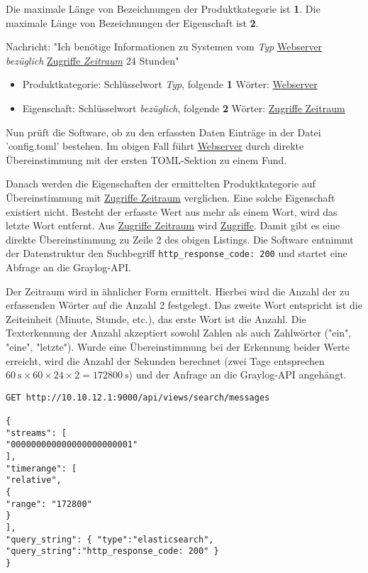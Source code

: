 Die maximale Länge von Bezeichnungen der Produktkategorie ist \textbf{1}. Die maximale Länge von Bezeichnungen der Eigenschaft ist \textbf{2}.

Nachricht: "Ich benötige Informationen zu Systemen vom \textit{Typ} \uline{Webserver} \textit{bezüglich} \uline{Zugriffe \textit{Zeitraum}} 24 Stunden"

\begin{itemize}
\item Produktkategorie: Schlüsselwort \textit{Typ}, folgende \textbf{1} Wörter: \uline{Webserver}
\item Eigenschaft: Schlüsselwort \textit{bezüglich}, folgende \textbf{2} Wörter: \uline{Zugriffe Zeitraum}
\end{itemize}

Nun prüft die Software, ob zu den erfassten Daten Einträge in der Datei 'config.toml' bestehen. Im obigen Fall führt \uline{Webserver} durch direkte Übereinstimmung mit der ersten TOML-Sektion zu einem Fund. 

Danach werden die Eigenschaften der ermittelten Produktkategorie auf Übereinstimmung mit \uline{Zugriffe Zeitraum} verglichen. Eine solche Eigenschaft existiert nicht. Besteht der erfasste Wert aus mehr als einem Wort, wird das letzte Wort entfernt. Aus \uline{Zugriffe Zeitraum} wird \uline{Zugriffe}. Damit gibt es eine direkte Übereinstimmung zu Zeile 2 des obigen Listings. Die Software entnimmt der Datenstruktur den Suchbegriff \lstinline{http_response_code: 200} und startet eine Abfrage an die Graylog-API.

Der Zeitraum wird in ähnlicher Form ermittelt. Hierbei wird die Anzahl der zu erfassenden Wörter auf die Anzahl 2 festgelegt. Das zweite Wort entspricht ist die Zeiteinheit (Minute, Stunde, etc.), das erste Wort ist die Anzahl. Die Texterkennung der Anzahl akzeptiert sowohl Zahlen als auch Zahlwörter ("ein", "eine", "letzte"). Wurde eine Übereinstimmung bei der Erkennung beider Werte erreicht, wird die Anzahl der Sekunden berechnet (zwei Tage entsprechen $60~\mathrm{s} \times 60 \times 24 \times 2 = 172800~\mathrm{s}$) und der Anfrage an die Graylog-API angehängt.

\begin{lstlisting}[caption={Anfrage der Software an Graylog mit den ermittelten Daten}, label=graylog-query, xleftmargin=6mm]
GET http://10.10.12.1:9000/api/views/search/messages

{
"streams": [
"000000000000000000000001"
],
"timerange": [
"relative",
{
"range": "172800"
}
],
"query_string": { "type":"elasticsearch", "query_string":"http_response_code: 200" }
}
\end{lstlisting}

